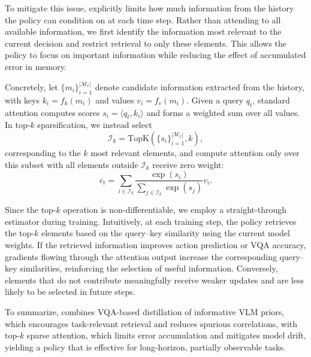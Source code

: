 To mitigate this issue, \ourmethod{} explicitly limits how much information from the history the policy can condition on at each time step.
Rather than attending to all available information, we first identify the information most relevant to the current decision and restrict retrieval to only these elements.
This allows the policy to focus on important information while reducing the effect of accumulated error in memory.

Concretely, let $\{m_i\}_{i=1}^{|\mathcal{M}_t|}$ denote candidate information extracted from the history, with keys $k_i = f_k(m_i)$ and values $v_i = f_v(m_i)$.
Given a query $q_t$, standard attention computes scores $s_i = \langle q_t, k_i \rangle$ and forms a weighted sum over all values.
In top-$k$ sparsification, we instead select
\begin{equation}
    \mathcal{I}_k = \mathrm{TopK}(\{s_i\}_{i=1}^{|\mathcal{M}_t|}, k),
\end{equation}
corresponding to the $k$ most relevant elements, and compute attention only over this subset with all elements outside $\mathcal{I}_k$ receive zero weight:
\begin{equation}
    c_t = \sum_{i \in \mathcal{I}_k}
    \frac{\exp(s_i)}{\sum_{j \in \mathcal{I}_k} \exp(s_j)} v_i.
\end{equation}

Since the top-$k$ operation is non-differentiable, we employ a straight-through estimator during training.
Intuitively, at each training step, the policy retrieves the top-$k$ elements based on the query--key similarity using the current model weights.
If the retrieved information improves action prediction or VQA accuracy, gradients flowing through the attention output increase the corresponding query--key similarities, reinforcing the selection of useful information.
Conversely, elements that do not contribute meaningfully receive weaker updates and are less likely to be selected in future steps.

To summarize, \ourmethod{} combines VQA-based distillation of informative VLM priors, which encourages task-relevant retrieval and reduces spurious correlations, with top-$k$ sparse attention, which limits error accumulation and mitigates model drift, yielding a policy that is effective for long-horizon, partially observable tasks.
